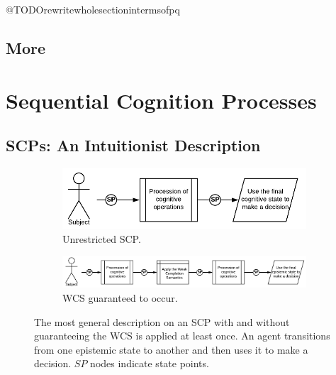 \documentclass[
11pt, %
english, %
singlespacing, %
headsepline, %
]{MastersDoctoralThesis} %
\begin{document}
@TODOrewritewholesectionintermsofpq

\section{More}

\chapter{Sequential Cognition Processes}
\section{SCPs: An Intuitionist Description} \label{ssec:intu}
\begin{figure}
\begin{subfigure}{.35\textwidth}
  \centering
  \includegraphics[width=0.97\linewidth]{general}
  \caption{Unrestricted SCP.}
  \label{fig:scp_general}
\end{subfigure}%
\begin{subfigure}{.65\textwidth}
  \centering
  \includegraphics[width=0.97\linewidth]{generalWCS}
  \caption{WCS guaranteed to occur.}
  \label{fig:sfig2}
\end{subfigure}
\caption{The most general description on an SCP with and without guaranteeing the WCS is applied at least once. An agent transitions from one epistemic state to another and then uses it to make a decision. $SP$ nodes indicate state points.}
\label{fig:scp_generalWCS}
\end{figure}
\end{document}
